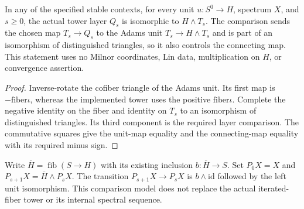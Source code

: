 \begin{proposition}
  \label{prop:h6-tower-layer-comparison}
  \leanok
  In any of the specified stable contexts, for every unit $u:S^0\to H$,
  spectrum $X$, and $s\ge0$, the actual tower layer $Q_s$ is isomorphic to
  $H\wedge T_s$. The comparison sends the chosen map $T_s\to Q_s$ to
  the Adams unit $T_s\to H\wedge T_s$ and is part of an isomorphism of
  distinguished triangles, so it also controls the connecting map.
  This statement uses no Milnor coordinates, Lin data, multiplication on
  $H$, or convergence assertion.
\end{proposition}
\begin{proof}
  Inverse-rotate the cofiber triangle of the Adams unit. Its first map is
  $-\mathrm{fiber}\iota$, whereas the implemented tower uses the positive
  $\mathrm{fiber}\iota$. Complete the negative identity on the fiber and
  identity on $T_s$ to an isomorphism of distinguished triangles. Its third
  component is the required layer comparison. The commutative squares give
  the unit-map equality and the connecting-map equality with its required
  minus sign.
  \leanok
\end{proof}

\begin{definition}
  \label{def:h6-smash-comparison-tower}
  \leanok
  Write $\overline H=\operatorname{fib}(S\to H)$ with its existing inclusion
  $b:\overline H\to S$. Set $P_0X=X$ and $P_{s+1}X=\overline H\wedge P_sX$.
  The transition $P_{s+1}X\to P_sX$ is $b\wedge\mathrm{id}$ followed by
  the left unit isomorphism. This comparison model does not replace the
  actual iterated-fiber tower or its internal spectral sequence.
\end{definition}

